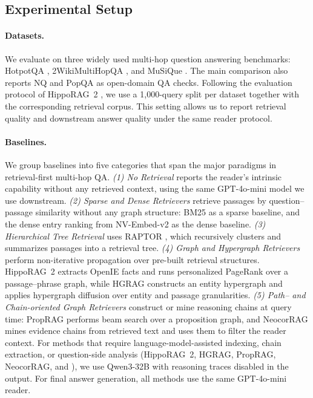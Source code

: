 \subsection{Experimental Setup}
\label{sec:experiments:setup}

\paragraph{Datasets.}
We evaluate on three widely used multi-hop question answering
benchmarks: HotpotQA \citep{yang2018hotpotqa}, 2WikiMultiHopQA
\citep{ho2020constructing}, and MuSiQue \citep{trivedi2022musique}.
The main comparison also reports NQ and PopQA as open-domain QA checks.
Following the evaluation protocol of HippoRAG~2
\citep{gutierrez2025hipporag}, we use a 1{,}000-query split per dataset
together with the corresponding retrieval corpus. This setting allows
us to report retrieval quality and downstream answer quality under the
same reader protocol.

\paragraph{Baselines.}
We group baselines into five categories that span the major paradigms
in retrieval-first multi-hop QA. \emph{(1) No Retrieval} reports the
reader's intrinsic capability without any retrieved context, using the
same GPT-4o-mini model we use downstream. \emph{(2) Sparse and Dense
Retrievers} retrieve passages by question--passage similarity without
any graph structure: BM25 \citep{robertson2009bm25} as a sparse
baseline, and the dense entry ranking from
NV-Embed-v2 \citep{lee2025nvembed} as the dense
baseline. \emph{(3) Hierarchical Tree Retrieval} uses RAPTOR
\citep{sarthi2024raptor}, which recursively clusters and summarizes
passages into a retrieval tree. \emph{(4) Graph and Hypergraph Retrievers} perform
non-iterative propagation over pre-built retrieval structures.
HippoRAG~2 \citep{gutierrez2025hipporag} extracts OpenIE facts and runs
personalized PageRank over a passage--phrase graph, while HGRAG
\citep{hgrag2024} constructs an entity hypergraph and applies
hypergraph diffusion over entity and passage granularities. \emph{(5) Path-- and
Chain-oriented Graph Retrievers} construct or mine reasoning chains at
query time: PropRAG \citep{wang2025proprag} performs beam search over a
proposition graph, and NeocorRAG \citep{peng2026neocorrag} mines
evidence chains from retrieved text and uses them to filter the reader
context. For methods that require language-model-assisted indexing,
chain extraction, or question-side analysis (HippoRAG~2, HGRAG,
PropRAG, NeocorRAG, and \methodname{}), we use Qwen3-32B with reasoning
traces disabled in the output. For final answer generation, all
methods use the same GPT-4o-mini reader.

